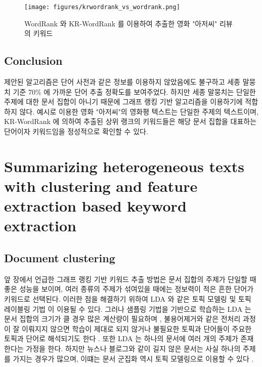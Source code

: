 \documentclass[11pt]{article}
\begin{document}
\begin{figure}[H]
\centering
\label{fig:krwordrank_vs_wordrank}
\texttt{[image: figures/krwordrank\_vs\_wordrank.png]}
\caption{WordRank 와 KR-WordRank 를 이용하여 추출한 영화 "아저씨" 리뷰의 키워드}
\end{figure}

\subsection{Conclusion}

제안된 알고리즘은 단어 사전과 같은 정보를 이용하지 않았음에도 불구하고 세종 말뭉치 기준 70\% 에 가까운 단어 추출 정확도를 보여주었다.
하지만 세종 말뭉치는 단일한 주제에 대한 문서 집합이 아니기 때문에 그래프 랭킹 기반 알고리즘을 이용하기에 적합하지 않다.
예시로 이용한 영화 "아저씨"의 영화평 텍스트는 단일한 주제의 텍스트이며, KR-WordRank 에 의하여 추출된 상위 랭크의 키워드들은 해당 문서 집합을 대표하는 단어이자 키워드임을 정성적으로 확인할 수 있다.


\newpage
\section{Summarizing heterogeneous texts with clustering and feature extraction based keyword extraction}

\subsection{Document clustering}

앞 장에서 언급한 그래프 랭킹 기반 키워드 추출 방법은 문서 집합의 주제가 단일할 때 좋은 성능을 보이며, 여러 종류의 주제가 섞여있을 때에는 정보력이 적은 흔한 단어가 키워드로 선택된다.
이러한 점을 해결하기 위하여 LDA \citep{blei2003latent} 와 같은 토픽 모델링 및 토픽 레이블링 기법 \citep{sievert2014ldavis} 이 이용될 수 있다.
그러나 샘플링 기법을 기반으로 학습하는 LDA 는 문서 집합의 크기가 클 경우 많은 계산량이 필요하며 \citep{yuan2015lightlda}, 불용어제거와 같은 전처리 과정이 잘 이뤄지지 않으면 학습이 제대로 되지 않거나 불필요한 토픽과 단어들이 주요한 토픽과 단어로 해석되기도 한다 \citep{darling2011theoretical, newman2010evaluating}.
또한 LDA 는 하나의 문서에 여러 개의 주제가 존재한다는 가정을 한다.
하지만 뉴스나 블로그와 같이 길지 않은 문서는 사실 하나의 주제를 가지는 경우가 많으며, 이떄는 문서 군집화 역시 토픽 모델링으로 이용할 수 있다 \citep{dhillon2001concept, xu2003document}.
\end{document}
